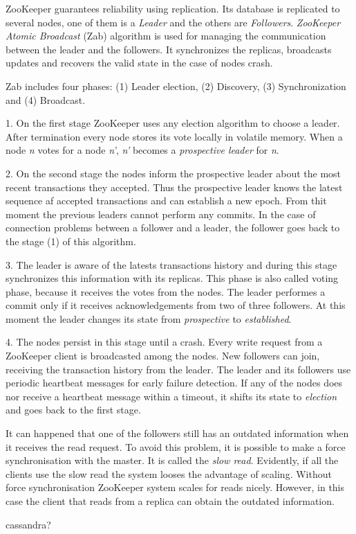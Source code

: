 ZooKeeper guarantees reliability using replication.
Its database is replicated to several nodes, one of them is a \textit{Leader} and the others are \textit{Followers}.
\textit{ZooKeeper Atomic Broadcast} (Zab) algorithm is used for managing the communication between the leader and the followers.
It synchronizes the replicas, broadcasts updates and recovers the valid state in the case of nodes crash.

Zab includes four phases: (1) Leader election, (2) Discovery, (3) Synchronization and (4) Broadcast.

1. On the first stage ZooKeeper uses any election algorithm to choose a leader.
After termination every node stores its vote locally in volatile memory.
When a node \textit{n} votes for a node \textit{n'}, \textit{n'} becomes a \textit{prospective leader} for \textit{n}.

2. On the second stage the nodes inform the prospective leader about the most recent transactions they accepted.
Thus the prospective leader knows the latest sequence af accepted transactions and can establish a new epoch.
From thit moment the previous leaders cannot perform any commits.
In the case of connection problems between a follower and a leader, the follower goes back to the stage (1) of this algorithm.

3. The leader is aware of the latests transactions history and during this stage synchronizes this information with its replicas.
This phase is also called voting phase, because it receives the votes from the nodes.
The leader performes a commit only if it receives acknowledgements from two of three followers.
At this moment the leader changes its state from \textit{prospective} to \textit{established}.

4. The nodes persist in this stage until a crash.
Every write request from a ZooKeeper client is broadcasted among the nodes.
New followers can join, receiving the transaction history from the leader.
The leader and its followers use periodic heartbeat messages for early failure detection.
If any of the nodes does nor receive a heartbeat message within a timeout, it shifts its state to \textit{election} and goes back to the first stage.

It can happened that one of the followers still has an outdated information when it receives the read request.
To avoid this problem, it is possible to make a force synchronisation with the master.
It is called the \textit{slow read}.
Evidently, if all the clients use the slow read the system looses the advantage of scaling.
Without force synchronisation ZooKeeper system scales for reads nicely. 
However, in this case the client that reads from a replica can obtain the outdated information.


cassandra?